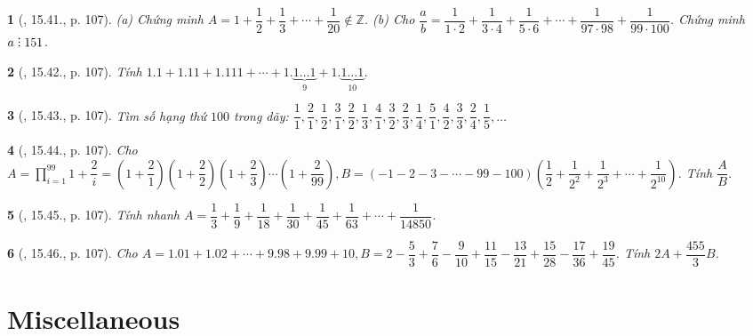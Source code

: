 \documentclass{article}
\newtheorem{baitoan}{}
\DeclareRobustCommand{\divby}{%
	\mathrel{\vbox{\baselineskip.65ex\lineskiplimit0pt\hbox{.}\hbox{.}\hbox{.}}}%
}
\begin{document}
\begin{baitoan}[\cite{TLCT_THCS_Toan_6_so_hoc}, 15.41., p. 107]
	(a) Chứng minh $A = 1 + \dfrac{1}{2} + \dfrac{1}{3} + \cdots + \dfrac{1}{20}\notin\mathbb{Z}$. (b) Cho $\dfrac{a}{b} = \dfrac{1}{1\cdot2} + \dfrac{1}{3\cdot4} + \dfrac{1}{5\cdot6} + \cdots + \dfrac{1}{97\cdot98} + \dfrac{1}{99\cdot100}$. Chứng minh $a\divby151$.
\end{baitoan}

\begin{baitoan}[\cite{TLCT_THCS_Toan_6_so_hoc}, 15.42., p. 107]
	Tính $1.1 + 1.11 + 1.111 + \cdots + 1.\underbrace{1\ldots1}_9 + 1.\underbrace{1\ldots1}_{10}$.
\end{baitoan}

\begin{baitoan}[\cite{TLCT_THCS_Toan_6_so_hoc}, 15.43., p. 107]
	Tìm số hạng thứ $100$ trong dãy: $\dfrac{1}{1},\dfrac{2}{1},\dfrac{1}{2},\dfrac{3}{1},\dfrac{2}{2},\dfrac{1}{3},\dfrac{4}{1},\dfrac{3}{2},\dfrac{2}{3},\dfrac{1}{4},\dfrac{5}{1},\dfrac{4}{2},\dfrac{3}{3},\dfrac{2}{4},\dfrac{1}{5},\ldots$
\end{baitoan}

\begin{baitoan}[\cite{TLCT_THCS_Toan_6_so_hoc}, 15.44., p. 107]
	Cho $A = \prod_{i=1}^{99} 1 + \dfrac{2}{i} = \left(1 + \dfrac{2}{1}\right)\left(1 + \dfrac{2}{2}\right)\left(1 + \dfrac{2}{3}\right)\cdots\left(1 + \dfrac{2}{99}\right),B = (-1 - 2 - 3 - \cdots - 99 - 100)\left(\dfrac{1}{2} + \dfrac{1}{2^2} + \dfrac{1}{2^3} + \cdots + \dfrac{1}{2^{10}}\right)$. Tính $\dfrac{A}{B}$.
\end{baitoan}

\begin{baitoan}[\cite{TLCT_THCS_Toan_6_so_hoc}, 15.45., p. 107]
	Tính nhanh $A = \dfrac{1}{3} + \dfrac{1}{9} + \dfrac{1}{18} + \dfrac{1}{30} + \dfrac{1}{45} + \dfrac{1}{63} + \cdots + \dfrac{1}{14850}$.
\end{baitoan}

\begin{baitoan}[\cite{TLCT_THCS_Toan_6_so_hoc}, 15.46., p. 107]
	Cho $A = 1.01 + 1.02 + \cdots + 9.98 + 9.99 + 10,B = 2 - \dfrac{5}{3} + \dfrac{7}{6} - \dfrac{9}{10} + \dfrac{11}{15} - \dfrac{13}{21} + \dfrac{15}{28} - \dfrac{17}{36} + \dfrac{19}{45}$. Tính $2A + \dfrac{455}{3}B$.
\end{baitoan}


\section{Miscellaneous}


\printbibliography[heading=bibintoc]
	
\end{document}

